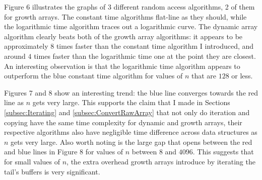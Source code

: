 Figure 6 illustrates the graphs of 3 different random access algorithms, 2 of them for growth arrays. The constant time algorithms flat-line as they should, while the logarithmic time algorithm traces out a logarithmic curve. The dynamic array algorithm clearly beats both of the growth array algorithms: it appears to be approximately $8$ times faster than the constant time algorithm I introduced, and around $4$ times faster than the logarithmic time one at the point they are closest. An interesting observation is that the logarithmic time algorithm appears to outperform the blue constant time algorithm for values of $n$ that are $128$ or less.

Figures 7 and 8 show an interesting trend: the blue line converges towards the red line as $n$ gets very large. This supports the claim that I made in Sections \ref{subsec:Iterating} and \ref{subsec:ConvertRawArray} that not only do iteration and copying have the same time complexity for dynamic and growth arrays, their respective algorithms also have negligible time difference across data structures as $n$ gets very large. Also worth noting is the large gap that opens between the red and blue lines in Figure 8 for values of $n$ between $8$ and $4096$. This suggests that for small values of $n$, the extra overhead growth arrays introduce by iterating the tail's buffers is very significant.
